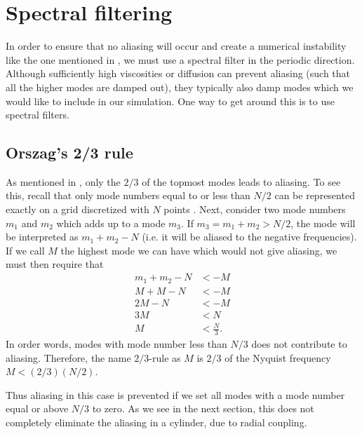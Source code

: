 \section{Spectral filtering}
%
In order to ensure that no aliasing will occur and create a numerical instability like the one mentioned in \cite{Phillips1959}, we must use a spectral filter in the periodic direction.
Although sufficiently high viscosities or diffusion can prevent aliasing (such that all the higher modes are damped out), they typically also damp modes which we would like to include in our simulation.
One way to get around this is to use spectral filters.

\subsection{Orszag's 2/3 rule}
As mentioned in \cite{Orszag1971}, only the $2/3$ of the topmost modes leads to aliasing.
To see this, recall that only mode numbers equal to or less than $N/2$ can be represented exactly on a grid discretized with $N$ points \cite{Bracewell2000book}.
Next, consider two mode numbers $m_1$ and $m_2$ which adds up to a mode $m_3$.
If $m_3=m_1+m_2>N/2$, the mode will be interpreted as $m_1+m_2 - N$ (i.e. it will be aliased to the negative frequencies).
If we call $M$ the highest mode we can have which would not give aliasing, we must then require that
%
\begin{align*}
    m_1+m_2 - N &< -M\\
    M + M - N &< -M\\
    2M - N &< -M\\
    3M &<  N\\
    M &< \frac{N}{3}.
\end{align*}
%
In order words, modes with mode number less than $N/3$ does not contribute to aliasing.
Therefore, the name $2/3$-rule as $M$ is $2/3$ of the Nyquist frequency $M < (2/3)(N/2)$.

Thus aliasing in this case is prevented if we set all modes with a mode number equal or above $N/3$ to zero.
As we see in the next section, this does not completely eliminate the aliasing in a cylinder, due to radial coupling.

